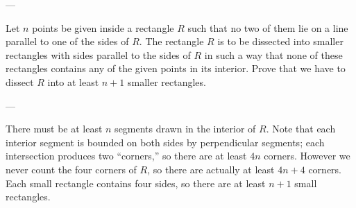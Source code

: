 
---

Let $n$ points be given inside a rectangle $R$ such that no two of them lie on a line parallel to one of the sides of $R$. The rectangle $R$ is to be dissected into smaller rectangles with sides parallel to the sides of $R$ in such a way that none of these rectangles contains any of the given points in its interior. Prove that we have to dissect $R$ into at least $n+1$ smaller rectangles.

---

There must be at least $n$ segments drawn in the interior of $R$. Note that each interior segment is bounded on both sides by perpendicular segments; each intersection produces two ``corners,'' so there are at least $4n$ corners. However we never count the four corners of $R$, so there are actually at least $4n+4$ corners. Each small rectangle contains four sides, so there are at least $n+1$ small rectangles.

